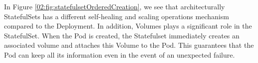 \begin{enumerate}
    In Figure \ref{02:fig:statefulsetOrderedCreation}, we see that architecturally StatefulSets has a different self-healing and scaling operations mechanism compared to the Deployment.
    In addition, Volumes plays a significant role in the StatefulSet.
    When the Pod is created, the Statefulset immediately creates an associated volume and attaches this Volume to the Pod.
    This guarantees that the Pod can keep all its information even in the event of an unexpected failure.

\end{enumerate}